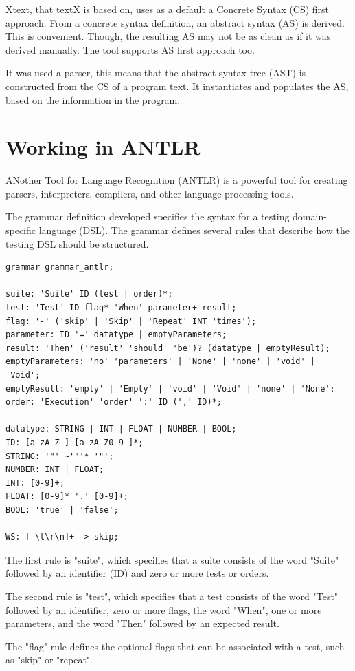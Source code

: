 Xtext, that textX is based on, uses as a default a Concrete Syntax (CS) first approach. From a concrete syntax definition, an abstract syntax (AS) is derived. This is convenient. Though, the resulting AS may not be as clean as if it was derived manually.  The tool supports AS first approach too.

It was used a parser, this means that the abstract syntax tree (AST) is constructed from the CS of a program text. It instantiates and populates the AS, based on the information in the program.

\section{Working in ANTLR}
ANother Tool for Language Recognition (ANTLR) is a powerful tool for creating parsers, interpreters, compilers, and other language processing tools.

The grammar definition developed specifies the syntax for a testing domain-specific language (DSL). The grammar defines several rules that describe how the testing DSL should be structured.

\begin{verbatim}
grammar grammar_antlr;

suite: 'Suite' ID (test | order)*;
test: 'Test' ID flag* 'When' parameter+ result;
flag: '-' ('skip' | 'Skip' | 'Repeat' INT 'times');
parameter: ID '=' datatype | emptyParameters;
result: 'Then' ('result' 'should' 'be')? (datatype | emptyResult);
emptyParameters: 'no' 'parameters' | 'None' | 'none' | 'void' | 'Void';
emptyResult: 'empty' | 'Empty' | 'void' | 'Void' | 'none' | 'None';
order: 'Execution' 'order' ':' ID (',' ID)*;

datatype: STRING | INT | FLOAT | NUMBER | BOOL;
ID: [a-zA-Z_] [a-zA-Z0-9_]*;
STRING: '"' ~'"'* '"';
NUMBER: INT | FLOAT;
INT: [0-9]+;
FLOAT: [0-9]* '.' [0-9]+;
BOOL: 'true' | 'false';

WS: [ \t\r\n]+ -> skip;
\end{verbatim}

The first rule is "suite", which specifies that a suite consists of the word "Suite" followed by an identifier (ID) and zero or more tests or orders.

The second rule is "test", which specifies that a test consists of the word "Test" followed by an identifier, zero or more flags, the word "When", one or more parameters, and the word "Then" followed by an expected result.

The "flag" rule defines the optional flags that can be associated with a test, such as "skip" or "repeat".

